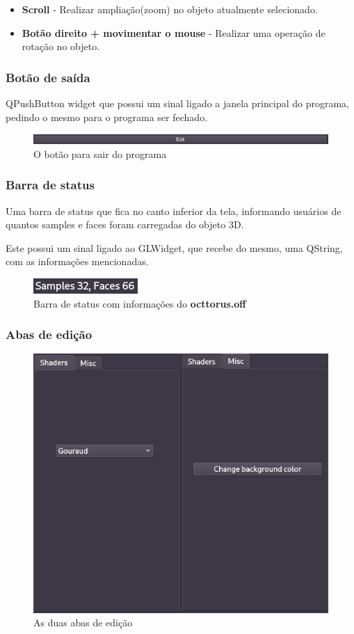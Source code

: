 \documentclass{ol-softwaremanual}
\begin{document}
\begin{itemize}
    \item \textbf{Scroll} - Realizar ampliação(zoom) no objeto 
    atualmente selecionado. 
    \item \textbf{Botão direito + movimentar o mouse} - Realizar uma operação 
    de rotação no objeto.
\end{itemize}

\subsubsection{Botão de saída}

QPushButton widget que possui um sinal ligado a janela principal do programa,
pedindo o mesmo para o programa ser fechado.

\begin{figure}[H]
    \centering
    \includegraphics[width=\textwidth]{botao-saida.png}
    \caption{O botão para sair do programa}
\end{figure}

\subsubsection{Barra de status}

Uma barra de status que fica no canto inferior da tela, 
informando usuários de quantos samples e faces foram carregadas 
do objeto 3D.

Este possui um sinal ligado ao GLWidget, que recebe do mesmo, 
uma QString, com as informações mencionadas.

\begin{figure}[H]
    \centering
    \includegraphics[width=.3\textwidth]{status-bar.png}
    \caption{Barra de status com informações do \textbf{octtorus.off}}
\end{figure}

\newpage

\subsubsection{Abas de edição}

\begin{figure}[H]
    \centering
    \includegraphics[width=.5\textwidth]{abadeedicao.jpg}
    \caption{As duas abas de edição}
\end{figure}
\end{document}
